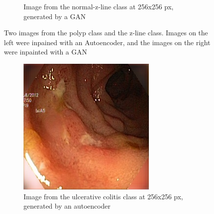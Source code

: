 \begin{figure}[h]
\begin{subfigure}[t]{0.4\textwidth}
            \caption{Image from the normal-z-line class at 256x256 px, generated by a GAN }    
            \label{fig:z_GAN_CORNER1}
        \end{subfigure}
        \caption{Two images from the polyp class and the z-line class. Images on the left were inpained with an Autoencoder, and the images on the right were inpainted with a GAN} 
        \label{fig:AE_GAN_CORNER1}
    \end{figure}
    
        \begin{figure}
        \centering
        \begin{subfigure}[t]{0.4\textwidth}
            \centering
            \includegraphics[width=\textwidth]{experiments/figures/blackcorner/ucAE.jpg}
            \caption{ Image from the ulcerative colitis class at 256x256 px, generated by an autoencoder }    
            \label{fig:polyp_AE_CORNER2}
        \end{subfigure}
        \qquad
        \begin{subfigure}[t]{0.4\textwidth}  
            \centering 

\end{subfigure}
\end{figure}
